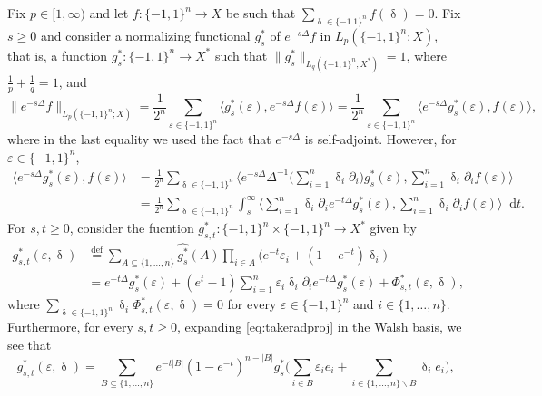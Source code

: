 \documentclass[11pt,reqno]{amsart}
\renewcommand{\geq}{\geqslant}
\renewcommand{\setminus}{\smallsetminus}
\newcommand{\e}{\varepsilon}
\newcommand{\1}{\mathbf 1}
\theoremstyle{remark}
\newcommand{\eqdef}{\stackrel{\mathrm{def}}{=}}
\renewcommand{\delta}{\updelta}
\newcommand*\diff{\mathop{}\!\mathrm{d}}
\begin{document}
 Fix $p\in[1,\infty)$ and let $f:\{-1,1\}^n\to X$ be such that $\sum_{\delta\in\{-1.1\}^n} f(\delta)=0$. Fix $s\geq0$ and consider a normalizing functional $g_s^\ast$ of $e^{-s\Delta}f$ in $L_p(\{-1,1\}^n;X)$, that is, a function $g_s^\ast:\{-1,1\}^n \to X^\ast$ such that $\|g_s^\ast\|_{L_q(\{-1,1\}^n;X^\ast)}=1$, where $\frac{1}{p}+\frac{1}{q}=1$, and
\begin{equation} \label{eq:writenormfun}
\|e^{-s\Delta}f\|_{L_p(\{-1,1\}^n;X)} = \frac{1}{2^n} \sum_{\e\in\{-1,1\}^n} \langle g_s^\ast(\e), e^{-s\Delta}f(\e)\rangle = \frac{1}{2^n} \sum_{\e\in\{-1,1\}^n} \langle e^{-s\Delta} g_s^\ast(\e), f(\e)\rangle,
\end{equation}
where in the last equality we used the fact that $e^{-s\Delta}$ is self-adjoint. However, for $\e\in\{-1,1\}^n$,
\begin{equation} \label{eq:usenormfun}
\begin{split}
\langle e^{-s\Delta} g_s^\ast(\e), f(\e)\rangle & = \frac{1}{2^n} \sum_{\delta\in\{-1,1\}^n} \langle e^{-s\Delta} \Delta^{-1} \Big( \sum_{i=1}^n \delta_i \partial_i\Big)g_s^\ast(\e) ,\sum_{i=1}^n \delta_i \partial_i f(\e) \rangle
\\ & = \frac{1}{2^n} \sum_{\delta\in\{-1,1\}^n} \int_s^\infty \langle  \sum_{i=1}^n \delta_i \partial_i e^{-t\Delta} g_s^\ast(\e) ,\sum_{i=1}^n \delta_i \partial_i f(\e) \rangle \diff t.
\end{split}
\end{equation}
For $s,t\geq0$, consider the fucntion $g_{s,t}^\ast: \{-1,1\}^n\times \{-1,1\}^n \to X^\ast$ given by
\begin{equation} \label{eq:takeradproj}
\begin{split}
g_{s,t}^\ast(\e,\delta) & \eqdef \sum_{A\subseteq\{1,\ldots,n\}} \widehat{g_s^\ast}(A) \prod_{i\in A} \big( e^{-t} \e_i + (1-e^{-t}) \delta_i\big)
\\ & = e^{-t\Delta} g_s^\ast(\e) + (e^t-1) \sum_{i=1}^n \e_i\delta_i\partial_i e^{-t\Delta}g_s^\ast(\e) + \Phi_{s,t}^\ast(\e,\delta),
\end{split}
\end{equation}
where $\sum_{\delta\in\{-1,1\}^n} \delta_i \Phi_{s,t}^\ast(\e,\delta)=0$ for every $\e\in\{-1,1\}^n$ and $i\in\{1,\ldots,n\}$. Furthermore, for every $s,t\geq0$, expanding \eqref{eq:takeradproj} in the Walsh basis, we see that
\begin{equation} \label{eq:twovarcontract1}
g_{s,t}^\ast(\e,\delta) = \sum_{B\subseteq\{1,\ldots,n\}} e^{-t|B|} (1-e^{-t})^{n-|B|} g_s^\ast\Big(\sum_{i\in B} \e_i e_i +\sum_{i\in\{1,\ldots,n\}\setminus B} \delta_i e_i\Big),
\end{equation}
\end{document}
